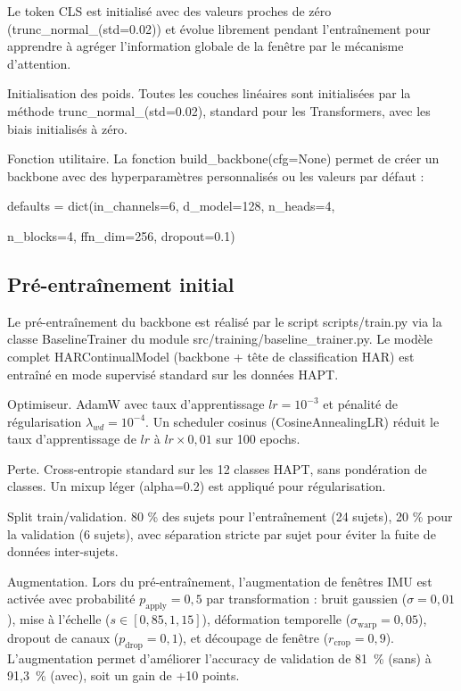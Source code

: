 Le token CLS est initialisé avec des valeurs proches de zéro (trunc\_normal\_(std=0.02)) et évolue librement pendant l'entraînement pour apprendre à agréger l'information globale de la fenêtre par le mécanisme d'attention.

Initialisation des poids. Toutes les couches linéaires sont initialisées par la méthode trunc\_normal\_(std=0.02), standard pour les Transformers, avec les biais initialisés à zéro.

Fonction utilitaire. La fonction build\_backbone(cfg=None) permet de créer un backbone avec des hyperparamètres personnalisés ou les valeurs par défaut :

defaults = dict(in\_channels=6, d\_model=128, n\_heads=4,

n\_blocks=4, ffn\_dim=256, dropout=0.1)

\subsection{Pré-entraînement initial}

Le pré-entraînement du backbone est réalisé par le script scripts/train.py via la classe BaselineTrainer du module src/training/baseline\_trainer.py. Le modèle complet HARContinualModel (backbone + tête de classification HAR) est entraîné en mode supervisé standard sur les données HAPT.

Optimiseur. AdamW avec taux d'apprentissage $lr = 10^{-3}$ et pénalité de régularisation $\lambda_{wd} = 10^{-4}$. Un scheduler cosinus (CosineAnnealingLR) réduit le taux d'apprentissage de $lr$ à $lr \times 0{,}01$ sur 100 epochs.

Perte. Cross-entropie standard sur les 12 classes HAPT, sans pondération de classes. Un mixup léger (alpha=0.2) est appliqué pour régularisation.

Split train/validation. 80 \% des sujets pour l'entraînement (24 sujets), 20 \% pour la validation (6 sujets), avec séparation stricte par sujet pour éviter la fuite de données inter-sujets.

Augmentation. Lors du pré-entraînement, l'augmentation de fenêtres IMU est activée avec probabilité $p_{\mathrm{apply}} = 0{,}5$ par transformation : bruit gaussien ($\sigma = 0{,}01$), mise à l'échelle ($s \in [0{,}85, 1{,}15]$), déformation temporelle ($\sigma_{\mathrm{warp}} = 0{,}05$), dropout de canaux ($p_{\mathrm{drop}} = 0{,}1$), et découpage de fenêtre ($r_{\mathrm{crop}} = 0{,}9$). L'augmentation permet d'améliorer l'accuracy de validation de 81~\% (sans) à 91,3~\% (avec), soit un gain de +10 points.

